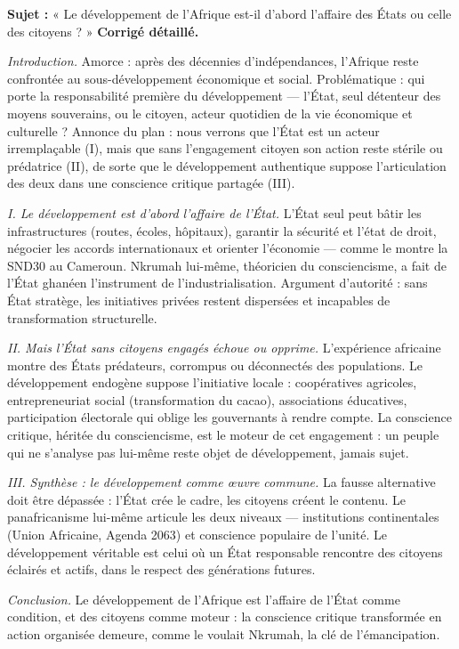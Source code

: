 \documentclass[11pt]{article}
\begin{document}
\begin{exoresolu}
\textbf{Sujet :} « Le développement de l'Afrique est-il d'abord l'affaire des États ou celle des citoyens ? »
\tcblower
\textbf{Corrigé détaillé.}

\emph{Introduction.} Amorce : après des décennies d'indépendances, l'Afrique reste confrontée au sous-développement économique et social. Problématique : qui porte la responsabilité première du développement — l'État, seul détenteur des moyens souverains, ou le citoyen, acteur quotidien de la vie économique et culturelle ? Annonce du plan : nous verrons que l'État est un acteur irremplaçable (I), mais que sans l'engagement citoyen son action reste stérile ou prédatrice (II), de sorte que le développement authentique suppose l'articulation des deux dans une conscience critique partagée (III).

\emph{I. Le développement est d'abord l'affaire de l'État.} L'État seul peut bâtir les infrastructures (routes, écoles, hôpitaux), garantir la sécurité et l'état de droit, négocier les accords internationaux et orienter l'économie — comme le montre la SND30 au Cameroun. Nkrumah lui-même, théoricien du consciencisme, a fait de l'État ghanéen l'instrument de l'industrialisation. Argument d'autorité : sans État stratège, les initiatives privées restent dispersées et incapables de transformation structurelle.

\emph{II. Mais l'État sans citoyens engagés échoue ou opprime.} L'expérience africaine montre des États prédateurs, corrompus ou déconnectés des populations. Le développement endogène suppose l'initiative locale : coopératives agricoles, entrepreneuriat social (transformation du cacao), associations éducatives, participation électorale qui oblige les gouvernants à rendre compte. La conscience critique, héritée du consciencisme, est le moteur de cet engagement : un peuple qui ne s'analyse pas lui-même reste objet de développement, jamais sujet.

\emph{III. Synthèse : le développement comme œuvre commune.} La fausse alternative doit être dépassée : l'État crée le cadre, les citoyens créent le contenu. Le panafricanisme lui-même articule les deux niveaux — institutions continentales (Union Africaine, Agenda 2063) et conscience populaire de l'unité. Le développement véritable est celui où un État responsable rencontre des citoyens éclairés et actifs, dans le respect des générations futures.

\emph{Conclusion.} Le développement de l'Afrique est l'affaire de l'État comme condition, et des citoyens comme moteur : la conscience critique transformée en action organisée demeure, comme le voulait Nkrumah, la clé de l'émancipation.
\end{exoresolu}
\end{document}
